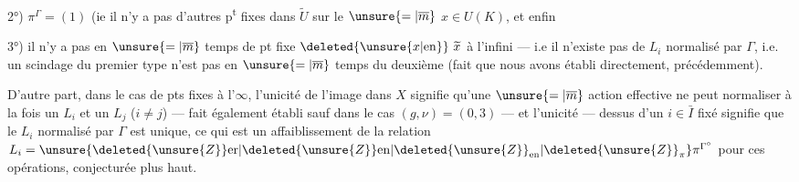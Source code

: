 2°) $\pi^\Gamma=(1)$ (ie il n'y a pas d'autres
p\textsuperscript{t} fixes dans $\widetilde U$ sur le $\unsure{=|\overline m}$ $x\in U(K)$,
et enfin

3°) il n'y a pas en $\unsure{=|\overline m}$ temps de pt
fixe $\deleted{\unsure{x|\mathrm{en}}}\ \widetilde x$ à l'infini --- i.e il n'existe
pas de $L_i$ normalisé par $\Gamma$, i.e. un scindage
du premier type n'est pas en $\unsure{=|\overline m}$ temps
du deuxième (fait que nous avons
établi directement, précédemment).


D'autre part, dans le cas de pts fixes
à l'$\infty$, l'unicité de l'image dans $X$
signifie qu'une $\unsure{=|\overline m}$ action effective ne
peut normaliser à la fois un $L_i$ et un $L_j$
($i\ne j$) --- fait également établi sauf
dans le cas $(g,\nu)=(0,3)$ --- et l'unicité
--- dessus d'un $i\in\bar I$ fixé signifie
que le $L_i$  normalisé par $\Gamma$ est unique,
ce qui est un affaiblissement de la
relation $L_i=\unsure{\deleted{\unsure{Z}}\mathrm{er}|\deleted{\unsure{Z}}\mathrm{en}|\deleted{\unsure{Z}}_{\mathrm{en}}|\deleted{\unsure{Z}}_{\pi}}\pi^{\Gamma^\circ}$
pour ces opérations, conjecturée plus haut.

